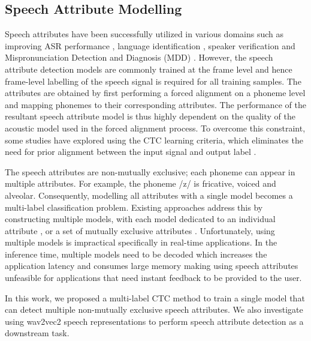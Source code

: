 \documentclass[12pt]{elsarticle}
\begin{document}
\subsection{Speech Attribute Modelling}
Speech attributes have been successfully utilized in various domains such as improving ASR performance \cite{RN288, RN289}, language identification \cite{RN146}, speaker verification \cite{RN290} and Mispronunciation Detection and Diagnosis (MDD) \cite{RN154}. However, the speech attribute detection models are commonly trained at the frame level and hence frame-level labelling of the speech signal is required for all training samples. The attributes are obtained by first performing a forced alignment on a phoneme level and mapping phonemes to their corresponding attributes. The performance of the resultant speech attribute model is thus highly dependent on the quality of the acoustic model used in the forced alignment process. To overcome this constraint, some studies have explored using the CTC learning criteria, which eliminates the need for prior alignment between the input signal and output label \cite{RN291, RN292, RN293, RN162}.

The speech attributes are non-mutually exclusive; each phoneme can appear in multiple attributes. For example, the phoneme /z/ is fricative, voiced and alveolar. Consequently, modelling all attributes with a single model becomes a multi-label classification problem. Existing approaches address this by constructing multiple models, with each model dedicated to an individual attribute \cite{RN148, RN149}, or a set of mutually exclusive attributes \cite{RN160,RN161}. Unfortunately, using multiple models is impractical specifically in real-time applications. In the inference time, multiple models need to be decoded which increases the application latency and consumes large memory making using speech attributes unfeasible for applications that need instant feedback to be provided to the user.

In this work, we proposed a multi-label CTC method to train a single model that can detect multiple non-mutually exclusive speech attributes. We also investigate using wav2vec2 speech representations to perform speech attribute detection as a downstream task. 
 
\end{document}
